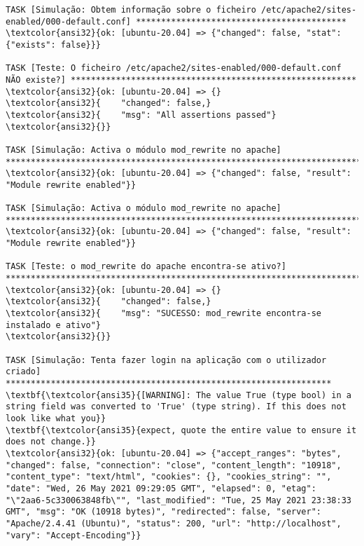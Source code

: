 \documentclass{scrartcl}
\begin{document}
\begin{Verbatim}
TASK [Simulação: Obtem informação sobre o ficheiro /etc/apache2/sites-enabled/000-default.conf] ******************************************
\textcolor{ansi32}{ok: [ubuntu-20.04] => {"changed": false, "stat": {"exists": false}}}

TASK [Teste: O ficheiro /etc/apache2/sites-enabled/000-default.conf NÃO existe?] *********************************************************
\textcolor{ansi32}{ok: [ubuntu-20.04] => {}
\textcolor{ansi32}{    "changed": false,}
\textcolor{ansi32}{    "msg": "All assertions passed"}
\textcolor{ansi32}{}}

TASK [Simulação: Activa o módulo mod_rewrite no apache] **********************************************************************************
\textcolor{ansi32}{ok: [ubuntu-20.04] => {"changed": false, "result": "Module rewrite enabled"}}

TASK [Simulação: Activa o módulo mod_rewrite no apache] **********************************************************************************
\textcolor{ansi32}{ok: [ubuntu-20.04] => {"changed": false, "result": "Module rewrite enabled"}}

TASK [Teste: o mod_rewrite do apache encontra-se ativo?] *********************************************************************************
\textcolor{ansi32}{ok: [ubuntu-20.04] => {}
\textcolor{ansi32}{    "changed": false,}
\textcolor{ansi32}{    "msg": "SUCESSO: mod_rewrite encontra-se instalado e ativo"}
\textcolor{ansi32}{}}

TASK [Simulação: Tenta fazer login na aplicação com o utilizador criado] *****************************************************************
\textbf{\textcolor{ansi35}{[WARNING]: The value True (type bool) in a string field was converted to 'True' (type string). If this does not look like what you}}
\textbf{\textcolor{ansi35}{expect, quote the entire value to ensure it does not change.}}
\textcolor{ansi32}{ok: [ubuntu-20.04] => {"accept_ranges": "bytes", "changed": false, "connection": "close", "content_length": "10918", "content_type": "text/html", "cookies": {}, "cookies_string": "", "date": "Wed, 26 May 2021 09:29:05 GMT", "elapsed": 0, "etag": "\"2aa6-5c330063848fb\"", "last_modified": "Tue, 25 May 2021 23:38:33 GMT", "msg": "OK (10918 bytes)", "redirected": false, "server": "Apache/2.4.41 (Ubuntu)", "status": 200, "url": "http://localhost", "vary": "Accept-Encoding"}}


\end{Verbatim}
\end{document}
